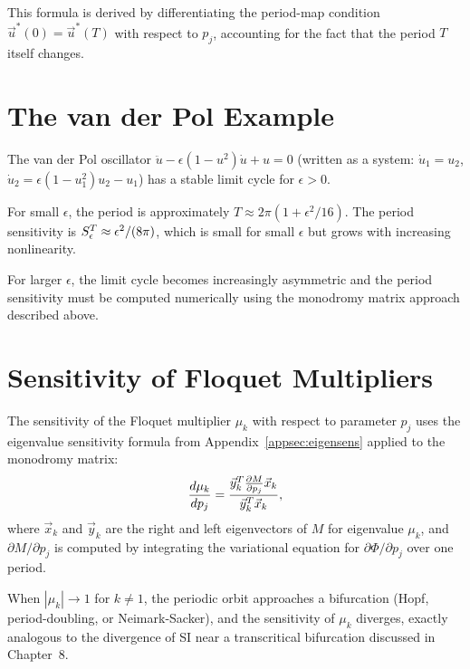 This formula is derived by differentiating the period-map condition
$\vec{u}^*(0) = \vec{u}^*(T)$ with respect to $p_j$, accounting for
the fact that the period $T$ itself changes.

\section{The van der Pol Example}
\label{appsec:vanderpol}

The van der Pol oscillator $\ddot{u} - \epsilon(1-u^2)\dot{u} + u = 0$
(written as a system: $\dot{u}_1 = u_2$, $\dot{u}_2 = \epsilon(1-u_1^2)u_2 - u_1$)
has a stable limit cycle for $\epsilon > 0$.

For small $\epsilon$, the period is approximately $T \approx 2\pi(1 + \epsilon^2/16)$.
The period sensitivity is $S_{\epsilon}^{T} \approx \epsilon^2/(8\pi)$,
which is small for small $\epsilon$ but grows with increasing nonlinearity.

For larger $\epsilon$, the limit cycle becomes increasingly asymmetric
and the period sensitivity must be computed numerically using the
monodromy matrix approach described above.

\section{Sensitivity of Floquet Multipliers}
\label{appsec:floquetsens}

The sensitivity of the Floquet multiplier $\mu_k$ with respect to
parameter $p_j$ uses the eigenvalue sensitivity formula from
Appendix~\ref{appsec:eigensens} applied to the monodromy matrix:
\begin{equation}
  \frac{d \mu_k}{d p_j} = \frac{\vec{y}_k^T\frac{\partial M}{\partial p_j}\vec{x}_k}{\vec{y}_k^T\vec{x}_k},
  \label{eq:floquetsens}
\end{equation}
where $\vec{x}_k$ and $\vec{y}_k$ are the right and left eigenvectors
of $M$ for eigenvalue $\mu_k$, and $\partial M/\partial p_j$ is computed
by integrating the variational equation for $\partial\Phi/\partial p_j$
over one period.

When $|\mu_k| \to 1$ for $k \neq 1$, the periodic orbit approaches
a bifurcation (Hopf, period-doubling, or Neimark-Sacker), and the
sensitivity of $\mu_k$ diverges, exactly analogous to the
divergence of SI near a transcritical bifurcation discussed in Chapter~8.

